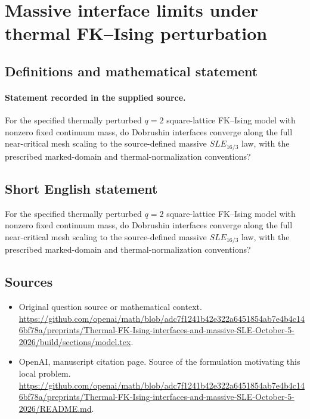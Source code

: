 \documentclass[11pt]{article}
\begin{document}
\section*{Massive interface limits under thermal FK–Ising perturbation}\label{statement}
\subsection{Definitions and mathematical statement}
\paragraph{Statement recorded in the supplied source.}
For the specified thermally perturbed $q=2$ square-lattice FK–Ising model with nonzero fixed continuum mass, do Dobrushin interfaces converge along the full near-critical mesh scaling to the source-defined massive $SLE_{16/3}$ law, with the prescribed marked-domain and thermal-normalization conventions?
\subsection{Short English statement}
For the specified thermally perturbed $q=2$ square-lattice FK–Ising model with nonzero fixed continuum mass, do Dobrushin interfaces converge along the full near-critical mesh scaling to the source-defined massive $SLE_{16/3}$ law, with the prescribed marked-domain and thermal-normalization conventions?
\subsection{Sources}
\begin{itemize}
\item[S1] Original question source or mathematical context.
\url{https://github.com/openai/math/blob/adc7f1241b42e322a6451854ab7e4b4c146bf78a/preprints/Thermal-FK-Ising-interfaces-and-massive-SLE-October-5-2026/build/sections/model.tex}.
\item[S2] OpenAI, manuscript citation page. Source of the formulation motivating this local problem.
\url{https://github.com/openai/math/blob/adc7f1241b42e322a6451854ab7e4b4c146bf78a/preprints/Thermal-FK-Ising-interfaces-and-massive-SLE-October-5-2026/README.md}.
\end{itemize}
\end{document}
